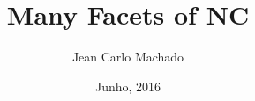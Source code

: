 \usepackage{graphicx}
\usepackage[utf8]{inputenc}
\title{Many Facets of NC}
\author{Jean Carlo Machado}
\date{Junho, 2016}
\usepackage[overlay,absolute]{textpos}
\usepackage{ragged2e}
\justifying
{}
\geometry{paperwidth=140mm,paperheight=105mm}
